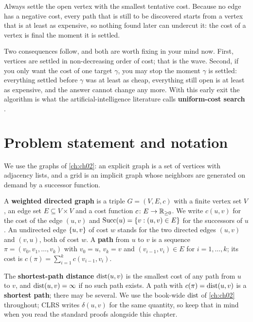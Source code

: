 \begin{keyidea}
Always settle the open vertex with the smallest tentative cost. Because no edge has a negative
cost, every path that is still to be discovered starts from a vertex that is at least as
expensive, so nothing found later can undercut it: the cost of a vertex is final the moment it
is settled.
\end{keyidea}

Two consequences follow, and both are worth fixing in your mind now. First, vertices are settled
in non-decreasing order of cost; that is the wave. Second, if you only want the cost of one
target $\gamma$, you may stop the moment $\gamma$ is settled: everything settled before $\gamma$ was at least
as cheap, everything still open is at least as expensive, and the answer cannot change any more.
With this early exit the algorithm is what the artificial-intelligence literature calls
\textbf{uniform-cost search} \cite{russell2020aima}.

\section{Problem statement and notation}
\label{sec:ch03-problem}

We use the graphs of \cref{ch:ch02}: an explicit graph is a set of vertices with adjacency
lists, and a grid is an implicit graph whose neighbors are generated on demand by a successor
function.

\begin{definition}
\label{def:ch03-graph}
A \textbf{weighted directed graph} is a triple $G=(V,E,c)$ with a finite
vertex set $V$, an edge set $E\subseteq V\times V$ and a cost function $c\colon E\to\mathbb{R}_{\ge0}$.
We write $c(u,v)$ for the cost of the edge $(u,v)$ and $\operatorname{Succ}(u)=\left\{ v : (u,v)\in E \right\}$ for the
successors of $u$. An undirected edge $\left\{ u,v \right\}$ of cost $w$ stands for the two directed edges
$(u,v)$ and $(v,u)$, both of cost $w$. A \textbf{path} from $u$ to $v$ is a sequence
$\pi=(v_0,v_1,\dots,v_k)$ with $v_0=u$, $v_k=v$ and $(v_{i-1},v_i)\in E$ for $i=1,\dots,k$; its
cost is $c(\pi)=\sum_{i=1}^{k}c(v_{i-1},v_i)$.
\end{definition}

\begin{definition}
\label{def:ch03-distance}
The \textbf{shortest-path distance} $\operatorname{dist}(u,v)$ is the smallest
cost of any path from $u$ to $v$, and $\operatorname{dist}(u,v)=\infty$ if no such path exists. A path with
$c(\pi)=\operatorname{dist}(u,v)$ is a \textbf{shortest path}; there may be several. We use the book-wide
$\operatorname{dist}$ of \cref{ch:ch02} throughout; CLRS \cite{cormen2009clrs} writes $\delta(u,v)$ for the
same quantity, so keep that in mind when you read the standard proofs alongside this chapter.
\end{definition}

